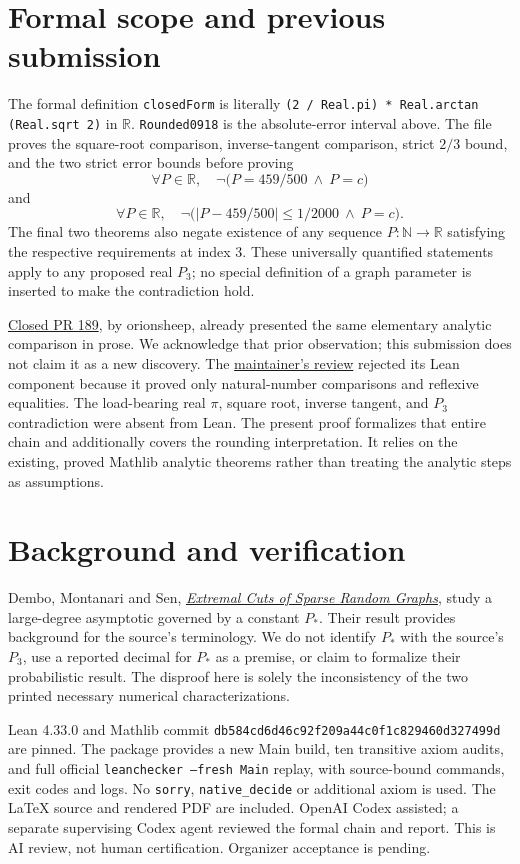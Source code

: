 \documentclass[11pt]{article}
\begin{document}
\section{Formal scope and previous submission}
The formal definition \texttt{closedForm} is literally
\texttt{(2 / Real.pi) * Real.arctan (Real.sqrt 2)} in $\mathbb R$.
\texttt{Rounded0918} is the absolute-error interval above.
The file proves the square-root comparison, inverse-tangent comparison,
strict $2/3$ bound, and the two strict error bounds before proving
\[
 \forall P\in\mathbb R,\quad
 \neg\bigl(P=459/500\ \wedge\ P=c\bigr)
\]
and
\[
 \forall P\in\mathbb R,\quad
 \neg\bigl(|P-459/500|\le1/2000\ \wedge\ P=c\bigr).
\]
The final two theorems also negate existence of any sequence
$P:\mathbb N\to\mathbb R$ satisfying the respective requirements at
index $3$. These universally quantified statements apply to any
proposed real $P_3$; no special definition of a graph parameter is
inserted to make the contradiction hold.

\href{https://github.com/The-Last-Math-Competition/The-Last-Math-Competition/pull/189}
{Closed PR 189}, by orionsheep, already presented the same elementary
analytic comparison in prose. We acknowledge that prior observation;
this submission does not claim it as a new discovery. The
\href{https://github.com/The-Last-Math-Competition/The-Last-Math-Competition/pull/189\#issuecomment-5965633103}
{maintainer's review} rejected its Lean component because it proved
only natural-number comparisons and reflexive equalities. The
load-bearing real $\pi$, square root, inverse tangent, and $P_3$
contradiction were absent from Lean. The present proof formalizes that
entire chain and additionally covers the rounding interpretation.
It relies on the existing, proved Mathlib analytic theorems rather
than treating the analytic steps as assumptions.

\section{Background and verification}
Dembo, Montanari and Sen,
\href{https://arxiv.org/abs/1503.03923}{\emph{Extremal Cuts of Sparse
Random Graphs}}, study a large-degree asymptotic governed by a constant
$P_*$. Their result provides background for the source's terminology.
We do not identify $P_*$ with the source's $P_3$, use a reported decimal
for $P_*$ as a premise, or claim to formalize their probabilistic result.
The disproof here is solely the inconsistency of the two printed
necessary numerical characterizations.

Lean 4.33.0 and Mathlib commit
\texttt{db584cd6d46c92f209a44c0f1c829460d327499d} are pinned.
The package provides a new Main build, ten transitive axiom audits,
and full official \texttt{leanchecker --fresh Main} replay, with
source-bound commands, exit codes and logs. No \texttt{sorry},
\texttt{native\_decide} or additional axiom is used.
The LaTeX source and rendered PDF are included. OpenAI Codex assisted;
a separate supervising Codex agent reviewed the formal chain and report.
This is AI review, not human certification. Organizer acceptance is pending.
\end{document}
